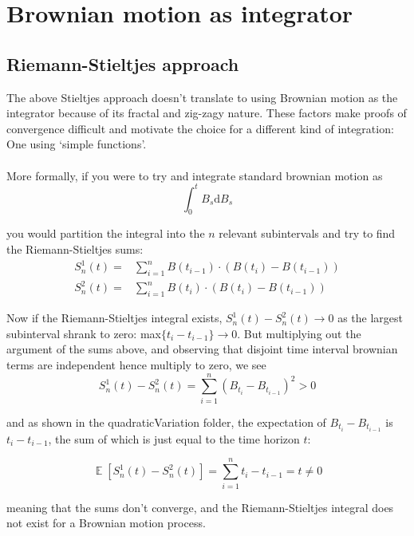 \documentclass[12pt]{article}
\DeclareMathOperator*{\E}{\mathbb{E}}
\begin{document}
\section{Brownian motion as integrator}

\subsection{Riemann-Stieltjes approach}
The above Stieltjes approach doesn't translate to using Brownian motion as the integrator because of its fractal and zig-zagy nature. These factors make proofs of convergence difficult and motivate the choice for a different kind of integration: One using `simple functions'.\\
\\
More formally, if you were to try and integrate standard brownian motion as
\begin{equation}
	\int_{0}^{t}B_s\mathrm{d}B_s
\end{equation}

\noindent you would partition the integral into the $n$ relevant subintervals and try to find the Riemann-Stieltjes sums:
\begin{eqnarray}
	S^1_n(t) =& \sum_{i=1}^{n}B(t_{i-1})\cdot(B(t_i)-B(t_{i-1}))\\
	S^2_n(t) =& \sum_{i=1}^{n}B(t_i)\cdot(B(t_i)-B(t_{i-1}))
\end{eqnarray}

\noindent Now if the Riemann-Stieltjes integral exists, $S^1_n(t)-S^2_n(t)\to 0$ as the largest subinterval shrank to zero: max$\{t_i-t_{i-1}\}\to 0$. But multiplying out the argument of the sums above, and observing that disjoint time interval brownian terms are independent hence multiply to zero, we see
\begin{equation}
	S^1_n(t)-S^2_n(t)=\sum_{i=1}^{n}\left(B_{t_i}-B_{t_{i-1}}\right)^2 > 0
\end{equation}

\noindent and as shown in the quadraticVariation folder, the expectation of $B_{t_i}-B_{t_{i-1}}$ is $t_i-t_{i-1}$, the sum of which is just equal to the time horizon $t$:

\begin{equation}
	\E\left[S^1_n(t)-S^2_n(t)\right]=\sum_{i=1}^{n}t_i-t_{i-1}=t\neq0
\end{equation}

\noindent meaning that the sums don't converge, and the Riemann-Stieltjes integral does not exist for a Brownian motion process.
\end{document}
